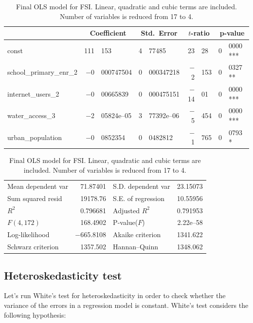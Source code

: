 \documentclass{article}
\begin{document}
\begin{table}[h]
\begin{center}
\vspace{1em}
\begin{tabular}{lr@{.}lr@{.}lr@{.}lr@{.}l}
\toprule
  &
 \multicolumn{2}{c}{Coefficient} &
  \multicolumn{2}{c}{Std.\ Error} &
   \multicolumn{2}{c}{$t$-ratio} &
    \multicolumn{2}{c}{p-value} \\[1ex]
\toprule
const &
  111&153 &
    4&77485 &
      23&28 &
        0&0000 ***\\
school\_primary\_enr\_2 &
  $-$0&000747504 &
    0&000347218 &
      $-$2&153 &
        0&0327 **\\
internet\_users\_2 &
  $-$0&00665839 &
    0&000475151 &
      $-$14&01 &
        0&0000 ***\\
water\_access\_3 &
  $-$2&05824\textrm{e--05} &
    3&77392\textrm{e--06} &
      $-$5&454 &
        0&0000 ***\\
urban\_population &
  $-$0&0852354 &
    0&0482812 &
      $-$1&765 &
        0&0793 *\\
\toprule
\end{tabular}

\vspace{1ex}
\begin{tabular}{lrlr}
\toprule
Mean dependent var &  71.87401 & S.D. dependent var &  23.15073 \\
Sum squared resid &  19178.76 & S.E. of regression &  10.55956 \\
$R^2$ &  0.796681 & Adjusted $R^2$ &  0.791953 \\
$F(4, 172)$ &  168.4902 & P-value($F$) &  2.22\textrm{e--58} \\
Log-likelihood & $-$665.8108 & Akaike criterion &  1341.622 \\
Schwarz criterion &  1357.502 & Hannan--Quinn &  1348.062 \\
\toprule
\end{tabular}
\end{center}

\caption{Final OLS model for FSI. Linear, quadratic and cubic terms are included. Number of variables is reduced from 17 to 4.}
\label{table:ols2}
\end{table}

\subsection{Heteroskedasticity test}

Let's run White's test for heteroskedasticity in order to check whether the variance of the errors in a regression model is constant. White's test considers the following hypothesis:
\end{document}
